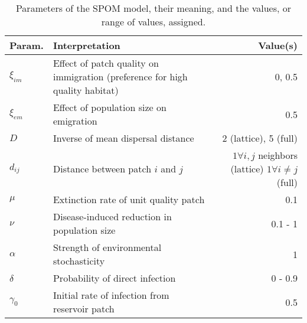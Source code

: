 \documentclass{article}
\begin{document}

\begin{table}[h!]   
\caption{Parameters of the SPOM model, their meaning, and the values, or range of values, assigned.}
\begin{tabular}{p{1cm} p{6cm} r}
Param. & Interpretation &  Value(s) \\
\hline
$\xi_{im}$ & Effect of patch quality on immigration (preference for high quality habitat) & 0, 0.5 \\
$\xi_{em}$ & Effect of population size on emigration & 0.5  \\
$D$& Inverse of mean dispersal distance & 2 (lattice), 5 (full) \\
$d_{ij}$ & Distance between patch $i$ and $j$ & \parbox[t]{4cm}{\raggedleft $1 \forall i, j$ neighbors (lattice)\\ $1 \forall  i\neq j$ (full)}\\
\hline
$\mu$ & Extinction rate of unit quality patch & 0.1 \\
$\nu$ & Disease-induced reduction in population size & 0.1 - 1 \\
$\alpha$ & Strength of environmental stochasticity & 1 \\
\hline
$\delta$ & Probability of direct infection & 0 - 0.9 \\
$\gamma_0$ & Initial rate of infection from reservoir patch & 0.5
\end{tabular}
\label{params}
\end{table}
\end{document}

